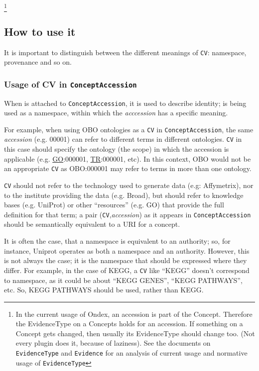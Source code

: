 \documentclass[a4paper,10pt]{article}
\newcommand{\field}[1]{\textit{#1}\xspace}
\newcommand{\term}[1]{\texttt{#1}\xspace}
\begin{document}
\footnote{
In the current usage of Ondex, an accession is part of the Concept. Therefore the EvidenceType on a Concepts holds for an accession. If something on a Concept gets changed, then usually its EvidenceType should change too. (Not every plugin does it, because of laziness). See the documents on \term{EvidenceType} and \term{Evidence} for an analysis of current usage and normative usage of \term{EvidenceType}
 }
 
 


\subsection{How to use it}

It is important to distinguish between the different meanings of \term{CV}: namespace,
provenance and so on. 

\subsubsection{Usage of CV in \term{ConceptAccession}}

When \cv is attached to \term{ConceptAccession}, it is used to describe
identity; \cv is being used as a namespace, within which the
\field{acccession} has a specific meaning. 

For example, when using OBO ontologies as a \term{CV} in
\term{ConceptAccession}, the same \field{accession} (e.g. 00001) can refer to
different terms in different ontologies. \term{CV} in this case should specify
the ontology (the scope) in which the accession is applicable (e.g.
\underline{GO}:000001, \underline{TR}:000001, etc). In this context, OBO would
not be an appropriate \term{CV} as OBO:000001 may refer to terms in more than
one ontology.

\term{CV} should not refer to the technology used to generate data (e.g:
Affymetrix), nor to the institute providing the data (e.g. Broad), but should
refer to knowledge bases (e.g. UniProt) or other ``resources'' (e.g. GO) that
provide the full definition for that term; a pair
(\term{CV},\field{accession}) as it appears in \term{ConceptAccession} should
be semantically equivalent to a URI for a concept.

It is often the case, that a namespace is equivalent to an authority; so, for
instance, Uniprot operates as both a namespace and an authority. However, this
is not always the case; it is the namespace that should be expressed where
they differ. For example, in the case of KEGG, a \term{CV} like ``KEGG''
doesn't correspond to namespace, as it could be about ``KEGG GENES'', ``KEGG
PATHWAYS'', etc. So, KEGG PATHWAYS should be used, rather than KEGG. 
\end{document}
